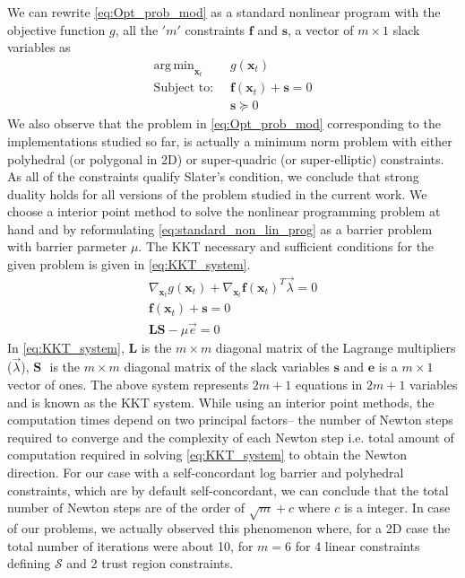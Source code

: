 \documentclass[12pt,a4]{article}
\DeclareMathOperator*{\argmin}{arg\,min}
\begin{document}
We can rewrite \cref{eq:Opt_prob_mod} as a standard nonlinear program with the objective function $g$, all the $'m'$ constraints $\textbf{f}$ and $\textbf{s}$, a vector of $m\times 1$ slack variables as 
\begin{align} \label{eq:standard_non_lin_prog}
\argmin_{\textbf{x}_t} ~& g(\textbf{x}_t) \\
\text{Subject to: }~ & \textbf{f}(\textbf{x}_t)+\textbf{s} =0 \nonumber\\
& \textbf{s}\succeq 0\nonumber
\end{align} 
We also observe that the problem in \cref{eq:Opt_prob_mod} corresponding to the implementations studied so far, is actually a minimum norm problem with either polyhedral (or polygonal in 2D)  or super-quadric (or super-elliptic) constraints. As all of the constraints qualify Slater's condition, we conclude that strong duality holds for all  versions of the problem studied in the current work. We choose a interior point method to solve the nonlinear programming problem at hand and by reformulating \cref{eq:standard_non_lin_prog} as a barrier problem with barrier parmeter $\mu$. The KKT necessary and sufficient conditions for the given problem is given in \cref{eq:KKT_system}.
\begin{align}\label{eq:KKT_system}
\nabla_{\textbf{x}_t}g(\textbf{x}_t)+\nabla_{\textbf{x}_t}\textbf{f}(\textbf{x}_t)^T \vec{\lambda} =0 \nonumber \\
\textbf{f}(\textbf{x}_t)+\textbf{s}=0 \\
\textbf{L}\textbf{S}-\mu \vec{e}=0 \nonumber
\end{align}
In \cref{eq:KKT_system}, $\textbf{L}$ is the $m \times m$ diagonal matrix of the Lagrange multipliers ($\vec{\lambda}$), $\textbf{S }$ is the $m \times m$ diagonal matrix of the slack variables $\textbf{s}$ and $\textbf{e}$ is a $m\times 1$ vector of ones. The above system represents $2m+1$ equations in $2m+1$ variables and is known as the KKT system. While using an interior point methods, the computation times depend on two principal factors-- the number of Newton steps required to converge and the complexity of each Newton step i.e. total amount of computation required in solving \cref{eq:KKT_system} to obtain the Newton direction. For our case with  a self-concordant log barrier and polyhedral constraints, which are by default self-concordant, we can conclude that the total number of Newton steps are of the order of $\sqrt{m}+c$ where $c$ is a integer. In case of our problems, we actually observed this phenomenon where, for a 2D case the total number of iterations were about 10, for $m=6$ for 4 linear constraints defining $\mathcal{S}$ and 2 trust region constraints.\\
\end{document}
